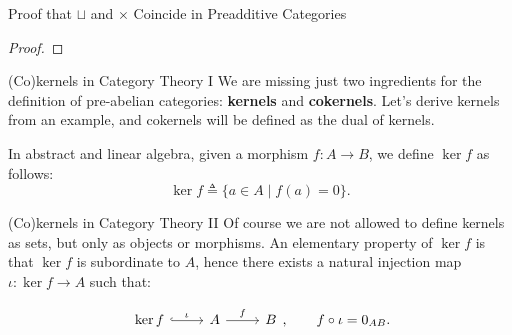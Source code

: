\documentclass{beamer}
\begin{document}
\begin{frame}[fragile]{Proof that \texorpdfstring{$\sqcup$}{⊔} and \texorpdfstring{$\times$}{×} Coincide in Preadditive Categories}
\begin{proof}

    \end{proof}
\end{frame}

\begin{frame}{(Co)kernels in Category Theory I}
    We are missing just two ingredients for the definition of pre-abelian categories:
    \textbf{kernels} and \textbf{cokernels}. Let's derive kernels from an example,
    and cokernels will be defined as the dual of kernels. \medskip
    
    
    In abstract and linear algebra, given a morphism $f : A \to B$, we define $\ker f$ as follows:
    \[
        \ker f \triangleq \{ a \in A \mid f(a) = 0 \}.
    \]
\end{frame}

\begin{frame}{(Co)kernels in Category Theory II}
    Of course we are not allowed to define kernels as sets, but only as objects or morphisms.
    An elementary property of $\ker f$ is that $\ker f$ is subordinate to $A$, hence
    there exists a natural injection map $\iota : \ker f \to A$ such that:

    \[\begin{tikzcd}[ampersand replacement=\&]
        {\ker f} \& A \& B
        \arrow["\iota", hook, from=1-1, to=1-2]
        \arrow["f", from=1-2, to=1-3]
    \end{tikzcd}, \qquad f \circ \iota = 0_{AB}. \]
\end{frame}
\end{document}
